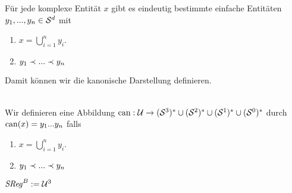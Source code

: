 Für jede komplexe Entität $x$ gibt es eindeutig bestimmte einfache Entitäten $y_1, ..., y_n \in \mathcal{S}^d$ mit
\begin{enumerate}
    \item $x = \bigcup_{i=1}^n y_i$.
    \item $y_1 \prec ... \prec y_n$
\end{enumerate}
Damit können wir die kanonische Darstellung definieren.

\begin{dfn}\ \\
    Wir definieren eine Abbildung $\text{can}: \mathcal{U} \to (\mathcal{S}^3)^* \cup (\mathcal{S}^2)^* \cup (\mathcal{S}^1)^* \cup (\mathcal{S}^0)^*$ durch $\text{can}(x) = y_1 ... y_n$ falls
    \begin{enumerate}
        \item $x = \bigcup_{i=1}^n y_i$.
        \item $y_1 \prec ... \prec y_n$
    \end{enumerate}
\end{dfn}




\begin{dfn}[$\GSReg$]
    $\mathit{S\hspace*{-0.25ex}Reg}^B := \mathcal{U}^3$
\end{dfn}


